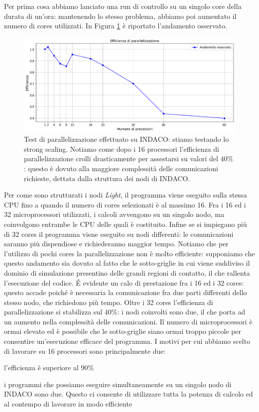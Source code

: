 Per prima cosa abbiamo lanciato una run di controllo su un singolo core della durata di un'ora: mantenendo lo stesso problema, abbiamo poi aumentato il numero di cores utilizzati. In Figura \ref{fig:testeff_indaco} è riportato l'andamento osservato.
\begin{figure}[h]
    \centering
    \includegraphics[width = \textwidth]{Immagini/Simulazioni/TestEfficienza_Indaco.png}
    \caption{Test di parallelizzazione effettuato su INDACO: stiamo testando lo strong scaling. Notiamo come dopo i 16 processori l'efficienza di parallelizzazione crolli drasticamente per assestarsi su valori del $40\%$: questo è dovuto alla maggiore complessità delle comunicazioni richieste, dettata dalla struttura dei nodi di INDACO.}
    \label{fig:testeff_indaco}
\end{figure}
Per come sono strutturati i nodi \textit{Light}, il programma viene eseguito sulla stessa CPU fino a quando il numero di cores selezionati è al massimo 16. Fra i 16 ed i 32 microprocessori utilizzati, i calcoli avvengono su un singolo nodo, ma coinvolgono entrambe le CPU delle quali è costituito. Infine se si impiegano più di 32 cores il programma viene eseguito su nodi differenti: le comunicazioni saranno più dispendiose e richiederanno maggior tempo.
Notiamo che per l'utilizzo di pochi cores la parallelizzazione non è molto efficiente: supponiamo che questo andamento sia dovuto al fatto che le sotto-griglie in cui viene suddiviso il dominio di simulazione presentino delle grandi regioni di contatto, il che rallenta l'esecuzione del codice.
\'E evidente un calo di prestazione fra i 16 ed i 32 cores: questo accade poiché è necessaria la comunicazione fra due parti differenti dello stesso nodo, che richiedono più tempo. 
Oltre i 32 cores l'efficienza di parallelizzazione si stabilizza sul $40\%$: i nodi coinvolti sono due, il che porta ad un aumento nella complessità delle comunicazioni. Il numero di microprocessori è ormai elevato ed è possibile che le sotto-griglie siano ormai troppo piccole per consentire un'esecuzione efficace del programma.
I motivi per cui abbiamo scelto di lavorare su 16 processori sono principalmente due:
\begin{list}{\textbf{-}}{\setlength{\itemsep}{0cm}}
    \item l'efficienza è superiore al $90\%$
    \item i programmi che possiamo eseguire simultaneamente su un singolo nodo di INDACO sono due. Questo ci consente di utilizzare tutta la potenza di calcolo ed al contempo di lavorare in modo efficiente
\end{list}


